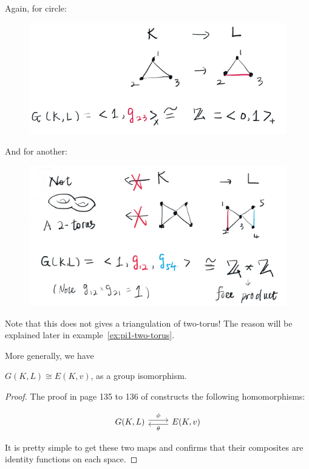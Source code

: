 \begin{ex}
    \label{ex:torus-GLKgroup}
    Again, for circle:
    \begin{figure}[H]
        \centering
        \includegraphics[width=0.9\linewidth]{pics/ch6-notes-3/ex3-L-in-triangle.png}
    \end{figure}
\end{ex}
\begin{ex}
    \label{ex:ex4-L-in-two-torus}
    And for another:
    \begin{figure}[H]
        \centering
        \includegraphics[width=0.9\linewidth]{pics/ch6-notes-3/ex4-L-in-two-torus.png}
    \end{figure}
    Note that this does not gives a triangulation of two-torus! 
    The reason will be explained later in
    example~\ref{ex:pi1-two-torus}.
\end{ex}
More generally, we have
\begin{thm}
    $G(K,L)\cong E(K,v)$, as a group isomorphism.
\end{thm}
\begin{proof}
    The proof in page 135 to 136 of \cite{book} constructs the
    following homomorphisms:

    $$\begin{tikzcd}[]
        G(K,L)\ar[r,"\phi",shift left] & 
            E(K,v)\ar[l,"\theta", shift left]
    \end{tikzcd}$$

    It is pretty simple to get these two maps and confirms that their
    composites are identity functions on each space.
\end{proof}

